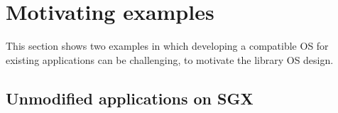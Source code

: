 



\section{Motivating examples}

This section shows two examples in which developing a compatible OS for existing applications can be challenging, to motivate the library OS design.


\subsection{Unmodified applications on SGX}
\label{sec:intro:sgx}


